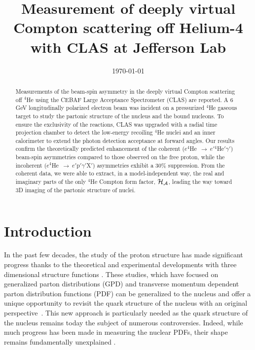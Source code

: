 \documentclass{article}
\begin{document}
\title{Measurement of deeply virtual Compton scattering off Helium-4 with CLAS at Jefferson Lab}

%

\date{\today}
\maketitle
\linenumbers

\begin{abstract}
Measurements of the beam-spin asymmetry in the deeply virtual Compton 
scattering off $^4$He using the CEBAF Large Acceptance Spectrometer (CLAS) are 
reported. A 6 GeV longitudinally polarized electron beam was incident on a 
pressurized $^4$He gaseous target to study the partonic structure of the 
nucleus and the bound nucleons. To ensure the exclusivity of the reactions, 
CLAS was upgraded with a radial time projection chamber to detect the 
low-energy recoiling $^4$He nuclei and an inner calorimeter to extend the 
photon detection acceptance at forward angles. Our results confirm the 
theoretically predicted enhancement of the coherent 
($e^4$He~$\to~e'$$^4$He$'\gamma'$) beam-spin asymmetries compared to those 
observed on the free proton, while the incoherent 
($e^4$He~$\to~e'$p$'\gamma'$X$'$) asymmetries exhibit a 30$\%$ suppression.  
From the coherent data, we were able to extract, in a model-independent way, 
the real and imaginary parts of the only $^4$He Compton form factor, $\cal 
H_A$, leading the way toward 3D imaging of the partonic structure of nuclei.
\end{abstract}



\section{Introduction}

In the past few decades, the study of the proton structure has made significant progress
thanks to the theoretical and experimental developments with three dimensional 
structure functions \cite{Anselmino:2015uka}. These studies, which have focused on generalized
parton distributions (GPD) and transverse momentum dependent parton distribution functions (PDF)
can be generalized to the nucleus and offer a unique opportunity to revisit the quark structure 
of the nucleus with an original perspective~\cite{Dupre:2015jha}. This new approach is 
particularly needed as the quark structure of the nucleus remains today the subject of numerous
controversies. Indeed, while much progress has been made in measuring the nuclear
PDFs, their shape remains fundamentally unexplained \cite{Norton:2003cb,Malace:2014uea,Hen:2016kwk}.
\end{document}
